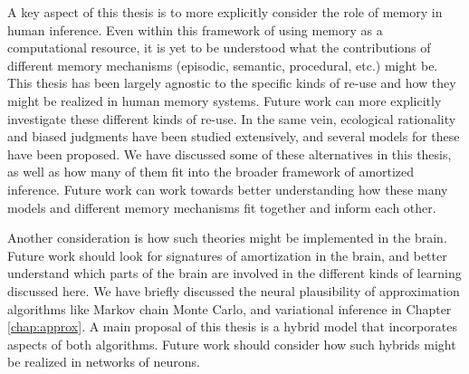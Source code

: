 A key aspect of this thesis is to more explicitly consider the role of memory in human inference. Even within this framework of using memory as a computational resource, it is yet to be understood what the contributions of different memory mechanisms (episodic, semantic, procedural, etc.) might be. This thesis has been largely agnostic to the specific kinds of re-use and how they might be realized in human memory systems. Future work can more explicitly investigate these different kinds of re-use. In the same vein, ecological rationality and biased judgments have been studied extensively, and several models for these have been proposed. We have discussed some of these alternatives in this thesis, as well as how many of them fit into the broader framework of amortized inference. Future work can work towards better understanding how these many models and different memory mechanisms fit together and inform each other.

Another consideration is how such theories might be implemented in the brain. Future work should look for signatures of amortization in the brain, and better understand which parts of the brain are involved in the different kinds of learning discussed here. We have briefly discussed the neural plausibility of approximation algorithms like Markov chain Monte Carlo, and variational inference in Chapter \ref{chap:approx}. A main proposal of this thesis is a hybrid model that incorporates aspects of both algorithms. Future work should consider how such hybrids might be realized in networks of neurons.



